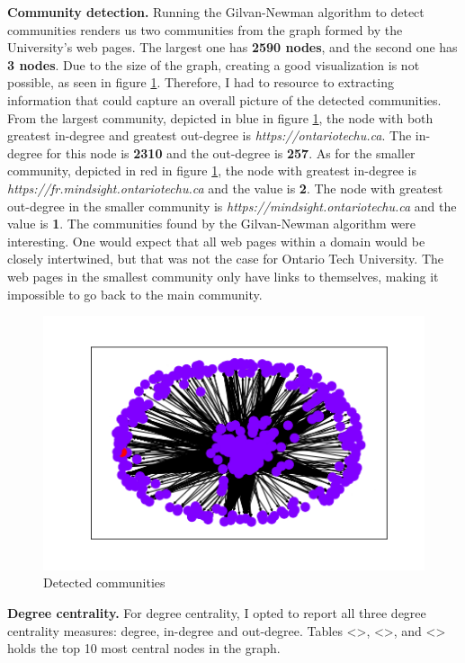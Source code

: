 \textbf{Community detection.} Running the Gilvan-Newman algorithm to detect communities renders us two communities from the graph formed by the University's web pages. The largest one has \textbf{2590 nodes}, and the second one has \textbf{3 nodes}. Due to the size of the graph, creating a good visualization is not possible, as seen in figure \ref{fig:7}. Therefore, I had to resource to extracting information that could capture an overall picture of the detected communities. From the largest community, depicted in blue in figure \ref{fig:7}, the node with both greatest in-degree and greatest out-degree is \textit{https://ontariotechu.ca}. The in-degree for this node is \textbf{2310} and the out-degree is \textbf{257}. As for the smaller community, depicted in red in figure \ref{fig:7}, the node with greatest in-degree is \textit{https://fr.mindsight.ontariotechu.ca} and the value is \textbf{2}. The node with greatest out-degree in the smaller community is \textit{https://mindsight.ontariotechu.ca} and the value is \textbf{1}. The communities found by the Gilvan-Newman algorithm were interesting. One would expect that all web pages within a domain would be closely intertwined, but that was not the case for Ontario Tech University. The web pages in the smallest community only have links to themselves, making it impossible to go back to the main community.

\begin{figure}
    \centering
    \includegraphics[width=0.75\linewidth]{img/otu_communities.png}
    \caption{Detected communities}
    \label{fig:7}
\end{figure}

\textbf{Degree centrality.} For degree centrality, I opted to report all three degree centrality measures: degree, in-degree and out-degree. Tables <>, <>, and <> holds the top 10 most central nodes in the graph.

